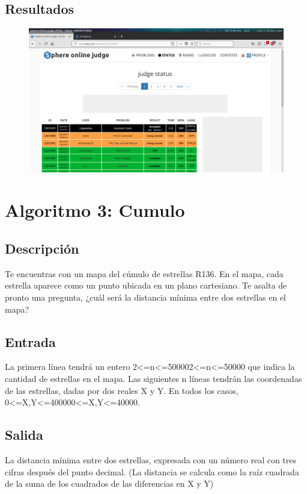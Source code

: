 \documentclass[12pt, fleqn]{article}                             %
\theoremstyle{break}                                            %
\begin{document}
\subsection{Resultados}
\begin{figure}[H]
               \centering
                \includegraphics[scale=.4]{DV2}
            \end{figure}



\section{Algoritmo 3: Cumulo}
\subsection{Descripción}
Te encuentras con un mapa del cúmulo de estrellas R136. En el mapa, cada estrella aparece como un punto ubicada en un plano cartesiano. Te asalta de pronto una pregunta, ¿cuál será la distancia mínima entre dos estrellas en el mapa?
\subsection{Entrada}
La primera línea tendrá un entero 2<=n<=500002<=n<=50000 que indica la cantidad de estrellas en el mapa. Las siguientes n líneas tendrán las coordenadas de las estrellas, dadas por dos reales X y Y. En todos los casos, 0<=X,Y<=400000<=X,Y<=40000.
\subsection{Salida}
La distancia mínima entre dos estrellas, expresada con un número real con tres cifras después del punto decimal. (La distancia se calcula como la raíz cuadrada de la suma de los cuadrados de las diferencias en X y Y)
\end{document}
